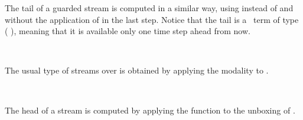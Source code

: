 The tail of a guarded stream is computed in a similar way, using  instead of  and without the application of  in the last step. Notice that the tail is a \GTT\ term of type  ( ), meaning that it is available only one time step ahead from now.
\begin{code}%
\>[0]\AgdaSpace{}%
\AgdaSymbol{:}\AgdaSpace{}%
\AgdaSymbol{\{}\AgdaSpace{}%
\AgdaSymbol{:}\AgdaSpace{}%
\AgdaSpace{}%
\AgdaSymbol{\}}\AgdaSpace{}%
\AgdaSymbol{\{}\AgdaSpace{}%
\AgdaSymbol{:}\AgdaSpace{}%
\AgdaSpace{}%
\AgdaSymbol{\}}\AgdaSpace{}%
\AgdaSpace{}%
\AgdaSpace{}%
\AgdaSpace{}%
\AgdaSymbol{(}\AgdaSpace{}%
\AgdaSymbol{)}\AgdaSpace{}%
\AgdaSpace{}%
\AgdaSpace{}%
\AgdaSpace{}%
\AgdaSymbol{(}\AgdaSpace{}%
\AgdaSymbol{(}\AgdaSpace{}%
\AgdaSymbol{))}\<%
\\
\>[0]\AgdaSpace{}%
\AgdaSymbol{\{}\AgdaSymbol{\}\{}\AgdaSymbol{\}}\AgdaSpace{}%
\AgdaSpace{}%
\AgdaSymbol{=}\AgdaSpace{}%
\AgdaSpace{}%
\AgdaSymbol{(}\AgdaSpace{}%
\AgdaSymbol{((}\AgdaSpace{}%
\AgdaSymbol{(}\AgdaSpace{}%
\AgdaSymbol{))}\AgdaSpace{}%
\AgdaSpace{}%
\AgdaSymbol{(}\AgdaSpace{}%
\AgdaSymbol{))}\AgdaSpace{}%
\AgdaSymbol{)}\<%
\end{code}
The usual type of streams over  is obtained by applying the  modality to  .
\begin{code}%
\>[0]\AgdaSpace{}%
\AgdaSymbol{:}\AgdaSpace{}%
\AgdaSpace{}%
\AgdaSpace{}%
\AgdaSpace{}%
\AgdaSpace{}%
\<%
\\
\>[0]\AgdaSpace{}%
\AgdaSpace{}%
\AgdaSymbol{=}\AgdaSpace{}%
\AgdaSpace{}%
\AgdaSymbol{(}\AgdaSpace{}%
\AgdaSymbol{)}\<%
\end{code}
The head of a stream  is computed by applying the function  to the unboxing of .
